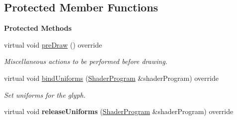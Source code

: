 \subsection*{Protected Member Functions}
\begin{Indent}\textbf{ Protected Methods}\par
\begin{DoxyCompactItemize}
\item 
virtual void \mbox{\hyperlink{classrev_1_1_glyph_a8abb4e9ab9d6a23c87450284b86dc636}{pre\+Draw}} () override
\begin{DoxyCompactList}\small\item\em Miscellaneous actions to be performed before drawing. \end{DoxyCompactList}\item 
\mbox{\label{classrev_1_1_glyph_a6dff1ab1b6c1f9e7715e7726be3b1f2e}} 
virtual void \mbox{\hyperlink{classrev_1_1_glyph_a6dff1ab1b6c1f9e7715e7726be3b1f2e}{bind\+Uniforms}} (\mbox{\hyperlink{classrev_1_1_shader_program}{Shader\+Program}} \&shader\+Program) override
\begin{DoxyCompactList}\small\item\em Set uniforms for the glyph. \end{DoxyCompactList}\item 
\mbox{\label{classrev_1_1_glyph_a78f6a7a346f425199a81c9fa964376c2}} 
virtual void {\bfseries release\+Uniforms} (\mbox{\hyperlink{classrev_1_1_shader_program}{Shader\+Program}} \&shader\+Program) override
\end{DoxyCompactItemize}
\end{Indent}

